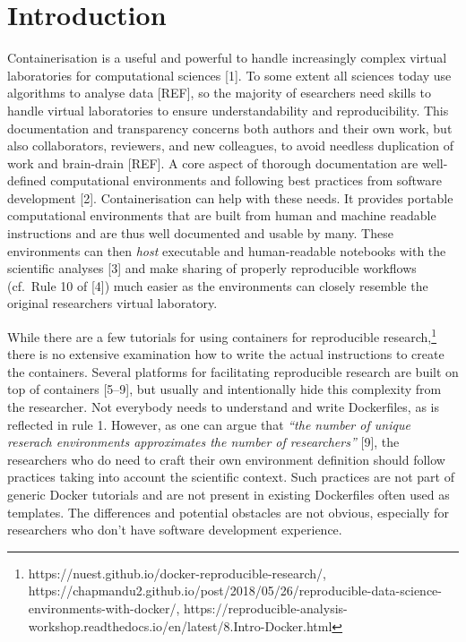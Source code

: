 \documentclass[10pt,letterpaper]{article}
\begin{document}
\linenumbers

\hypertarget{introduction}{%
\section*{Introduction}\label{introduction}}

Containerisation is a useful and powerful to handle increasingly complex
virtual laboratories for computational sciences {[}1{]}. To some extent
all sciences today use algorithms to analyse data {[}REF{]}, so the
majority of esearchers need skills to handle virtual laboratories to
ensure understandability and reproducibility. This documentation and
transparency concerns both authors and their own work, but also
collaborators, reviewers, and new colleagues, to avoid needless
duplication of work and brain-drain {[}REF{]}. A core aspect of thorough
documentation are well-defined computational environments and following
best practices from software development {[}2{]}. Containerisation can
help with these needs. It provides portable computational environments
that are built from human and machine readable instructions and are thus
well documented and usable by many. These environments can then
\emph{host} executable and human-readable notebooks with the scientific
analyses {[}3{]} and make sharing of properly reproducible workflows
(cf.~Rule 10 of {[}4{]}) much easier as the environments can closely
resemble the original researchers virtual laboratory.

While there are a few tutorials for using containers for reproducible
research,\footnote{https://nuest.github.io/docker-reproducible-research/,
  https://chapmandu2.github.io/post/2018/05/26/reproducible-data-science-environments-with-docker/,
  https://reproducible-analysis-workshop.readthedocs.io/en/latest/8.Intro-Docker.html}
there is no extensive examination how to write the actual instructions
to create the containers. Several platforms for facilitating
reproducible research are built on top of containers {[}5--9{]}, but
usually and intentionally hide this complexity from the researcher. Not
everybody needs to understand and write Dockerfiles, as is reflected in
rule 1. However, as one can argue that \emph{``the number of unique
reserach environments approximates the number of researchers''} {[}9{]},
the researchers who do need to craft their own environment definition
should follow practices taking into account the scientific context. Such
practices are not part of generic Docker tutorials and are not present
in existing Dockerfiles often used as templates. The differences and
potential obstacles are not obvious, especially for researchers who
don't have software development experience.
\end{document}
